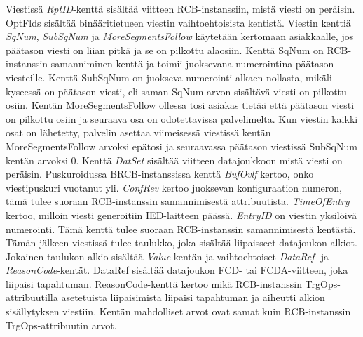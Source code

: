 Viestissä \emph{RptID}-kenttä sisältää viitteen RCB-instanssiin, mistä viesti on peräisin. OptFlds sisältää binääritietueen viestin vaihtoehtoisista kentistä. Viestin kenttiä \emph{SqNum}, \emph{SubSqNum} ja \emph{MoreSegmentsFollow} käytetään kertomaan asiakkaalle, jos päätason viesti on liian pitkä ja se on pilkottu alaosiin. Kenttä SqNum on RCB-instanssin samanniminen kenttä ja toimii juoksevana numerointina päätason viesteille. Kenttä SubSqNum on juokseva numerointi alkaen nollasta, mikäli kyseessä on päätason viesti, eli saman SqNum arvon sisältävä viesti on pilkottu osiin. Kentän MoreSegmentsFollow ollessa tosi asiakas tietää että päätason viesti on pilkottu osiin ja seuraava osa on odotettavissa palvelimelta. Kun viestin kaikki osat on lähetetty, palvelin asettaa viimeisessä viestissä kentän MoreSegmentsFollow arvoksi epätosi ja seuraavassa päätason viestissä SubSqNum kentän arvoksi 0. Kenttä \emph{DatSet} sisältää viitteen datajoukkoon mistä viesti on peräisin. Puskuroidussa BRCB-instanssissa kenttä \emph{BufOvlf} kertoo, onko viestipuskuri vuotanut yli. \emph{ConfRev} kertoo juoksevan konfiguraation numeron, tämä tulee suoraan RCB-instanssin samannimisestä attribuutista. \emph{TimeOfEntry} kertoo, milloin viesti generoitiin IED-laitteen päässä. \emph{EntryID} on viestin yksilöivä numerointi. Tämä kenttä tulee suoraan RCB-instanssin samannimisestä kentästä. Tämän jälkeen viestissä tulee taulukko, joka sisältää liipaisseet datajoukon alkiot. Jokainen taulukon alkio sisältää \emph{Value}-kentän ja vaihtoehtoiset \emph{DataRef}- ja \emph{ReasonCode}-kentät. DataRef sisältää datajoukon FCD- tai FCDA-viitteen, joka liipaisi tapahtuman. ReasonCode-kenttä kertoo mikä RCB-instanssin TrgOps-attribuutilla asetetuista liipaisimista liipaisi tapahtuman ja aiheutti alkion sisällytyksen viestiin. Kentän mahdolliset arvot ovat samat kuin RCB-instanssin TrgOps-attribuutin arvot.


